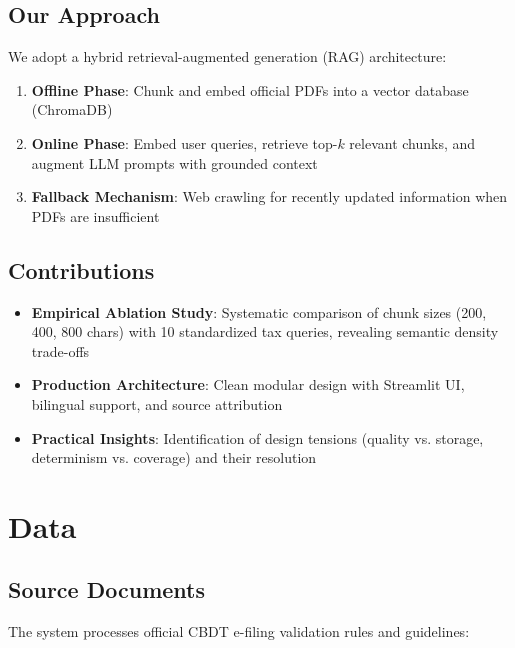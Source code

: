 \documentclass[11pt,a4paper]{article}
\begin{document}
\subsection{Our Approach}

We adopt a hybrid retrieval-augmented generation (RAG) architecture:
\begin{enumerate}
    \item \textbf{Offline Phase}: Chunk and embed official PDFs into a vector database (ChromaDB)
    \item \textbf{Online Phase}: Embed user queries, retrieve top-$k$ relevant chunks, and augment LLM prompts with grounded context
    \item \textbf{Fallback Mechanism}: Web crawling for recently updated information when PDFs are insufficient
\end{enumerate}

\subsection{Contributions}

\begin{itemize}
    \item \textbf{Empirical Ablation Study}: Systematic comparison of chunk sizes (200, 400, 800 chars) with 10 standardized tax queries, revealing semantic density trade-offs
    \item \textbf{Production Architecture}: Clean modular design with Streamlit UI, bilingual support, and source attribution
    \item \textbf{Practical Insights}: Identification of design tensions (quality vs. storage, determinism vs. coverage) and their resolution
\end{itemize}

\section{Data}
\label{sec:data}

\subsection{Source Documents}

The system processes official CBDT e-filing validation rules and guidelines:
\end{document}
